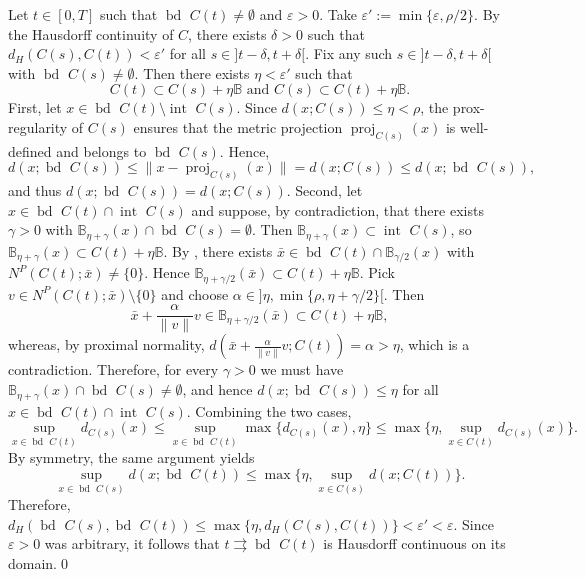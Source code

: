 \documentclass[preprint,12pt]{elsarticle}
\renewcommand{\epsilon}{\varepsilon}
\newcommand{\tto}{\rightrightarrows}
\def \B{\mathbb{B}}
\newcommand{\inte}{{\operatorname{int \  }}}
\newcommand{\bd}{{\operatorname{bd \ }}}
\DeclareMathOperator{\proj}{proj}
\theoremstyle{plain}
\theoremstyle{definition}
\theoremstyle{remark}
\begin{document}
		Let $t\in [0,T]$ such that $\bd C(t)\neq \emptyset$ and $\epsilon>0$. Take $\epsilon' := \min\{\epsilon,\rho/2\}$. By the Hausdorff continuity of $C$, there exists $\delta>0$ such that $d_H(C(s),C(t))<\epsilon'$ for all $s\in ]t-\delta,t+\delta[$. Fix any such $s\in ]t-\delta,t+\delta[$ with $\bd C(s)\neq \emptyset$. Then there exists $\eta<\epsilon'$ such that 
        $$
        C(t)\subset C(s)+\eta\B \textrm{ and } C(s)\subset C(t) + \eta\B.
        $$
        First, let $x\in \bd C(t)\setminus \inte C(s)$. Since $d(x;C(s))\leq \eta<\rho$, the prox-regularity of $C(s)$ ensures that the metric projection $\proj_{C(s)}(x)$ is well-defined and belongs to $\bd C(s)$. Hence, 
        $$
        d(x;\bd C(s))\leq \|x-\proj_{C(s)}(x)\| = d(x;C(s)) \leq d(x;\bd C(s)),
        $$
        and thus $d(x;\bd C(s)) = d(x;C(s))$. Second, let $x\in \bd C(t)\cap\inte C(s)$ and suppose, by contradiction, that there exists $\gamma>0$ with $\mathbb{B}_{\eta+\gamma}(x)\cap \bd C(s) = \emptyset$. Then  $\mathbb{B}_{\eta+\gamma}(x)\subset \inte C(s)$, so $\mathbb{B}_{\eta+\gamma}(x)\subset C(t) + \eta\mathbb{B}$. By \cite[Corollary 1.6.2]{Clarke1998}, there exists $\bar x\in \bd C(t)\cap \mathbb{B}_{\gamma/2}(x)$ with $N^P(C(t);\bar x)\neq\{0\}$. Hence $\mathbb{B}_{\eta+\gamma/2}(\bar x)\subset C(t)+\eta\mathbb{B}$. Pick $v\in N^P(C(t);\bar x)\setminus\{0\}$ and choose  $\alpha\in ]\eta , \min\{\rho,\eta+\gamma/2\}[$. Then 
        $$
        \bar x + \frac{\alpha}{\|v\|}v\in \mathbb{B}_{\eta+\gamma/2}(\bar x)\subset C(t) + \eta\mathbb{B},
        $$ whereas, by proximal normality, $d(\bar x + \frac{\alpha}{\|v\|}v;C(t)) = \alpha>\eta$, which is a contradiction. Therefore, for every $\gamma>0$ we must have $\mathbb{B}_{\eta+\gamma}(x)\cap \bd C(s)\neq\emptyset$, and hence  $d(x;\bd C(s))\leq \eta$ for all $x\in \bd C(t)\cap\inte C(s)$. Combining the two cases,  
		\begin{equation*}
				\sup_{x\in \bd C(t)}d_{C(s)}(x) \leq \sup_{x\in \bd C(t)}\max\{d_{C(s)}(x),\eta\}\leq \max\bigl\{\eta,\sup_{x\in C(t)}d_{C(s)}(x)\bigr\}.   
		\end{equation*}
		By symmetry, the same argument yields
        $$\sup_{x\in \bd C(s)}d(x;\bd C(t)) \leq \max\bigl\{\eta,\sup_{x\in C(s)}d(x;C(t))\bigr\}.
        $$
        Therefore, $d_H(\bd C(s),\bd C(t))\leq \max\{\eta,d_H(C(s),C(t))\}<\epsilon'<\epsilon$. Since $\epsilon>0$ was arbitrary, it follows that $t\tto \bd C(t)$ is Hausdorff continuous on its domain.\qed
\end{document}
